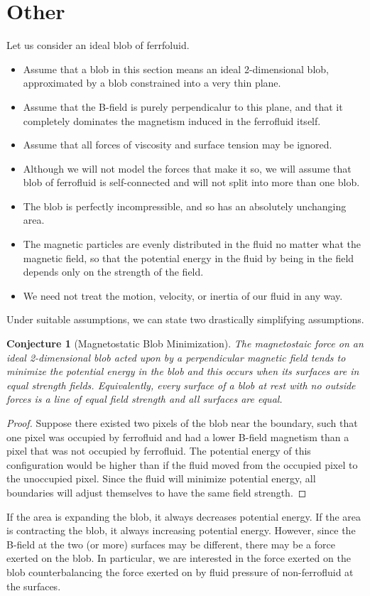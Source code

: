 \documentclass{asme2ej}
\newtheorem{conjecture}{Conjecture}
\begin{document}
\section{Other}


Let us consider an ideal blob of ferrfoluid.
\begin{itemize}
\item Assume that a blob in this section means an ideal 2-dimensional blob,
approximated by a blob constrained into a very thin plane.
\item Assume that the B-field is purely perpendicalur to this plane,
and that it completely dominates the magnetism induced in
the ferrofluid itself.
\item Assume that all forces of viscosity and surface tension may
  be ignored.
\item Although we will not model the forces that make it so,
  we will assume that blob of ferrofluid is self-connected and
  will not split into more than one blob.
\item The blob is perfectly incompressible, and so
  has an absolutely unchanging area.
\item The magnetic particles are evenly distributed in the
  fluid no matter what the magnetic field, so that the potential
  energy in the fluid by being in the field depends only on the
  strength of the field.
\item We need not treat the motion, velocity, or inertia of
  our fluid in any way.
\end{itemize}
Under suitable assumptions, we can state two drastically
simplifying assumptions.

\begin{conjecture}[Magnetostatic Blob Minimization]
  \label{conj:mbf}
  The magnetostaic force on an ideal 2-dimensional blob
  acted upon by a perpendicular magnetic field
  tends to minimize the potential energy in the blob
  and this occurs when its surfaces are in equal strength fields.
  Equivalently, every surface of a blob at rest with no outside
  forces is a line of equal field strength and all surfaces are equal.
\end{conjecture}


\begin{proof}
  Suppose there existed two pixels of the blob near the boundary,
  such that one pixel was occupied by ferrofluid and had a lower
  B-field magnetism than a pixel that was not occupied by ferrofluid.
  The potential energy of this configuration would be higher than
  if the fluid moved from the occupied pixel to the unoccupied pixel.
  Since the fluid will minimize potential energy, all boundaries
  will adjust themselves to have the same field strength.
  \end{proof}
If the area is expanding the blob, it always decreases potential
energy. If the area is contracting the blob, it always increasing
potential energy. However, since the B-field at the two (or more)
surfaces may be different, there may be a force exerted on the
blob. In particular, we are interested in the force exerted on
the blob counterbalancing the force exerted on by fluid pressure
of non-ferrofluid at the surfaces.
\end{document}
